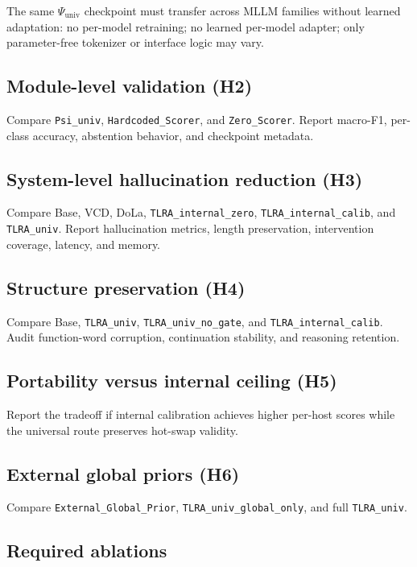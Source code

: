 The same $\Psi_{\mathrm{univ}}$ checkpoint must transfer across MLLM families without learned adaptation: no per-model retraining; no learned per-model adapter; only parameter-free tokenizer or interface logic may vary.

\subsection{Module-level validation (H2)}

Compare \texttt{Psi\_univ}, \texttt{Hardcoded\_Scorer}, and \texttt{Zero\_Scorer}. Report macro-F1, per-class accuracy, abstention behavior, and checkpoint metadata.

\subsection{System-level hallucination reduction (H3)}

Compare Base, VCD, DoLa, \texttt{TLRA\_internal\_zero}, \texttt{TLRA\_internal\_calib}, and \texttt{TLRA\_univ}. Report hallucination metrics, length preservation, intervention coverage, latency, and memory.

\subsection{Structure preservation (H4)}

Compare Base, \texttt{TLRA\_univ}, \texttt{TLRA\_univ\_no\_gate}, and \texttt{TLRA\_internal\_calib}. Audit function-word corruption, continuation stability, and reasoning retention.

\subsection{Portability versus internal ceiling (H5)}

Report the tradeoff if internal calibration achieves higher per-host scores while the universal route preserves hot-swap validity.

\subsection{External global priors (H6)}

Compare \texttt{External\_Global\_Prior}, \texttt{TLRA\_univ\_global\_only}, and full \texttt{TLRA\_univ}.

\subsection{Required ablations}

